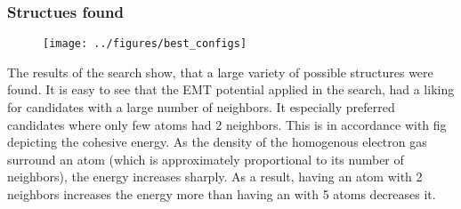 \documentclass[working, oneside]{../../../Preambles/marginclass}
\begin{document}
\subsubsection{Structues found}
\begin{figure}[htpb]
    \centering
    \texttt{[image: ../figures/best\_configs]}
    \label{fig:}
\end{figure}
The results of the search show, that a large variety of possible structures were found. It is easy to see that the EMT potential applied in the search, had a liking for candidates with a large number of neighbors. It especially preferred candidates where only few atoms had 2 neighbors. This is in accordance with fig depicting the cohesive energy. As the density of the homogenous electron gas surround an atom (which is approximately proportional to its number of neighbors), the energy increases sharply. As a result, having an atom with 2 neighbors increases the energy more than having an with 5 atoms decreases it.
\restoregeometry
\end{document}
